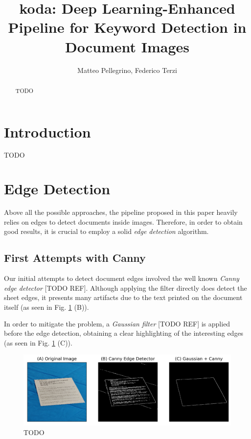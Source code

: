 \documentclass[a4paper]{article}
\title{koda: Deep Learning-Enhanced Pipeline for Keyword Detection in Document Images}
\author{Matteo Pellegrino, Federico Terzi}
\begin{document}
\maketitle

\begin{abstract}
TODO
\end{abstract}

\section{Introduction}
TODO


\section{Edge Detection}

Above all the possible approaches, the pipeline proposed in this paper heavily
relies on edges to detect documents inside images. Therefore, in order to obtain
good results, it is crucial to employ a solid \textit{edge detection} algorithm.


\subsection{First Attempts with Canny}

Our initial attempts to detect document edges involved the well known \textit{Canny edge detector} [TODO REF]. Although applying the filter directly does detect the sheet edges, it presents many artifacts
due to the text printed on the document itself (as seen in Fig. \ref{fig:canny_gaussian} (B)).

In order to mitigate the problem, a \textit{Gaussian filter} [TODO REF] is applied before the edge detection, obtaining a clear highlighting of the interesting edges (as seen in Fig.  \ref{fig:canny_gaussian} (C)).

\begin{figure}[!htb]
	\includegraphics[width=\linewidth]{canny_gaussian.png}
	\caption{TODO}
	\label{fig:canny_gaussian}
\end{figure}
\end{document}
